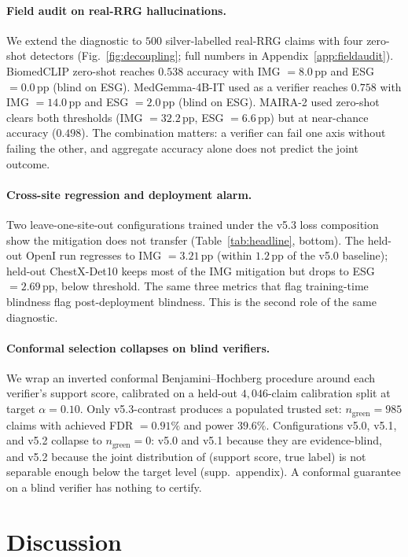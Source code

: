 \documentclass{article}
\begin{document}
\paragraph{Field audit on real-RRG hallucinations.} We extend the
diagnostic to $500$ silver-labelled real-RRG claims with four
zero-shot detectors (Fig.~\ref{fig:decoupling}; full numbers in
Appendix~\ref{app:fieldaudit}). BiomedCLIP zero-shot reaches
$0.538$ accuracy with IMG $= 8.0$\,pp and ESG $= 0.0$\,pp (blind on
ESG). MedGemma-4B-IT used as a verifier reaches $0.758$ with
IMG $= 14.0$\,pp and ESG $= 2.0$\,pp (blind on ESG). MAIRA-2 used
zero-shot clears both thresholds (IMG $= 32.2$\,pp,
ESG $= 6.6$\,pp) but at near-chance accuracy ($0.498$). The
combination matters: a verifier can fail one axis without failing
the other, and aggregate accuracy alone does not predict the joint
outcome.

\paragraph{Cross-site regression and deployment alarm.} Two
leave-one-site-out configurations trained under the v5.3 loss
composition show the mitigation does not transfer
(Table~\ref{tab:headline}, bottom). The held-out OpenI run
regresses to IMG $= 3.21$\,pp (within $1.2$\,pp of the v5.0
baseline); held-out ChestX-Det10 keeps most of the IMG mitigation
but drops to ESG $= 2.69$\,pp, below threshold. The same three
metrics that flag training-time blindness flag post-deployment
blindness. This is the second role of the same diagnostic.

\paragraph{Conformal selection collapses on blind verifiers.} We
wrap an inverted conformal Benjamini--Hochberg procedure around
each verifier's support score, calibrated on a held-out
$4{,}046$-claim calibration split at target $\alpha = 0.10$. Only
v5.3-contrast produces a populated trusted set:
$n_{\mathrm{green}} = 985$ claims with achieved FDR $= 0.91\%$ and
power $39.6\%$. Configurations v5.0, v5.1, and v5.2 collapse to
$n_{\mathrm{green}} = 0$: v5.0 and v5.1 because they are
evidence-blind, and v5.2 because the joint distribution of
(support score, true label) is not separable enough below the
target level (supp.\ appendix). A conformal guarantee
on a blind verifier has nothing to certify.

\section{Discussion}
\label{sec:discussion}
\end{document}
